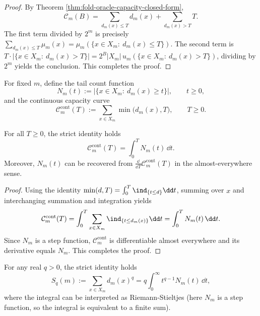 \begin{proof}
By Theorem \ref{thm:fold-oracle-capacity-closed-form},
\[
\mathcal{C}_m(B)=\sum_{d_m(x)\le T} d_m(x)+\sum_{d_m(x)>T}T.
\]
The first term divided by \(2^m\) is precisely \(\sum_{d_m(x)\le T}\mu_m(x)=\mu_m(\{x\in X_m:\ d_m(x)\le T\})\).
The second term is \(T\cdot|\{x\in X_m:\ d_m(x)>T\}|=2^B|X_m|\,u_m(\{x\in X_m:\ d_m(x)>T\})\), dividing by \(2^m\) yields the conclusion. This completes the proof.
\end{proof}

\begin{definition}\label{def:fold-capacity-tail}
For fixed \(m\), define the tail count function
\[
N_m(t):=\bigl|\{x\in X_m:\ d_m(x)\ge t\}\bigr|,\qquad t\ge 0,
\]
and the continuous capacity curve
\[
\mathcal{C}_m^{\mathrm{cont}}(T):=\sum_{x\in X_m}\min\bigl(d_m(x),T\bigr),\qquad T\ge 0.
\]
\end{definition}

\begin{proposition}\label{prop:fold-capacity-tail-equivalence}
For all \(T\ge 0\), the strict identity holds
\[
\mathcal{C}_m^{\mathrm{cont}}(T)=\int_{0}^{T} N_m(t)\,\dd t.
\]
Moreover, \(N_m(t)\) can be recovered from \(\frac{\dd}{\dd T}\mathcal{C}_m^{\mathrm{cont}}(T)\) in the almost-everywhere sense.
\end{proposition}

\begin{proof}
Using the identity \(\min(d,T)=\int_{0}^{T}\ind_{\{t\le d\}}\dd t\), summing over \(x\) and interchanging summation and integration yields
\[
\mathcal{C}_m^{\mathrm{cont}}(T)=\int_{0}^{T}\sum_{x\in X_m}\ind_{\{t\le d_m(x)\}}\dd t
=\int_{0}^{T}N_m(t)\,\dd t.
\]
Since \(N_m\) is a step function, \(\mathcal{C}_m^{\mathrm{cont}}\) is differentiable almost everywhere and its derivative equals \(N_m\). This completes the proof.
\end{proof}

\begin{proposition}\label{prop:fold-moment-mellin-stieltjes}
For any real \(q>0\), the strict identity holds
\[
S_q(m):=\sum_{x\in X_m} d_m(x)^q
=q\int_{0}^{\infty} t^{q-1}N_m(t)\,\dd t,
\]
where the integral can be interpreted as Riemann-Stieltjes (here \(N_m\) is a step function, so the integral is equivalent to a finite sum).
\end{proposition}

